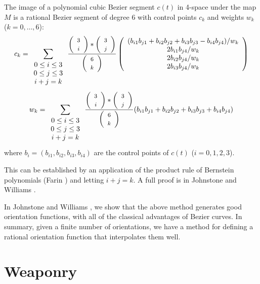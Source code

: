 \begin{lemma}
\label{sextic}
The image of a polynomial cubic Bezier segment $c(t)$ in 4-space 
under the map $M$
is a rational Bezier segment of degree 6 with control points $c_k$
and weights $w_k$ ($k = 0, \ldots, 6$):
\begin{equation}
\label{eq:control-pts}
c_k = \sum_{\begin{array}{c} 0 \leq i \leq 3 \\ 
			     0 \leq j \leq 3 \\ 
			     i+j=k
			     \end{array}} 
        \frac{\left( \begin{array}{c} \mbox{\footnotesize{$3$}} \\ \mbox{\footnotesize{$i$}} \end{array} \right) * \left( \begin{array}{c} \mbox{\footnotesize{$3$}} \\ \mbox{\footnotesize{$j$}} \end{array} \right)}{\left( \begin{array}{c} \mbox{\footnotesize{$6$}} \\ \mbox{\footnotesize{$k$}} \end{array} \right)}
	\left( \begin{array}{c}
            (b_{i1} b_{j1} + b_{i2} b_{j2} + b_{i3} b_{j3} - b_{i4} b_{j4}) / w_k \\
            2b_{i1} b_{j4} / w_k \\
            2b_{i2} b_{j4} / w_k \\
            2b_{i3} b_{j4} / w_k
	\end{array} \right)
\end{equation}
\begin{equation}
w_k = \sum_{\begin{array}{c} 0 \leq i \leq 3 \\ 
			     0 \leq j \leq 3 \\ 
			     i+j=k
			     \end{array}}
        \frac{\left( \begin{array}{c} \mbox{\footnotesize{$3$}} \\ \mbox{\footnotesize{$i$}} \end{array} \right) * \left( \begin{array}{c} \mbox{\footnotesize{$3$}} \\ \mbox{\footnotesize{$j$}} \end{array} \right)}{\left( \begin{array}{c} \mbox{\footnotesize{$6$}} \\ \mbox{\footnotesize{$k$}} \end{array} \right)}
	(b_{i1} b_{j1} + b_{i2} b_{j2} + b_{i3} b_{j3} + b_{i4} b_{j4})
\end{equation}
where $b_i = (b_{i1},b_{i2},b_{i3},b_{i4})$ are the control points of $c(t)$
($i=0,1,2,3$).
\end{lemma}
\prf
This can be established by an application of the product rule
of Bernstein polynomials (Farin \cite{farin93})
and letting $i+j=k$.
A full proof is in Johnstone and Williams \cite{jjjimbo94a}.
\QED

In Johnstone and Williams \cite{jjjimbo94a}, we show that the above
method generates good orientation functions, with all of the classical
advantages of Bezier curves.
In summary, given a finite number of orientations, we have a method
for defining a rational orientation function that interpolates them well.


\section{Weaponry}
\label{sec:weapon}

